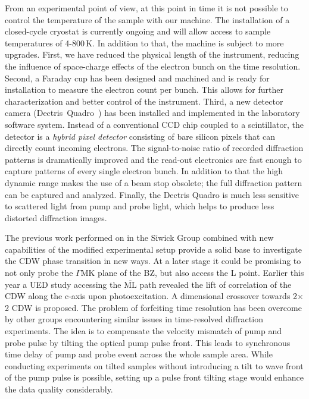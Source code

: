 From an experimental point of view, at this point in time it is not possible to control the temperature of the sample with our machine.
The installation of a closed-cycle cryostat is currently ongoing and will allow access to sample temperatures of 4-800\,K.
In addition to that, the machine is subject to more upgrades.
First, we have reduced the physical length of the instrument, reducing the influence of space-charge effects of the electron bunch on the time resolution.
Second, a Faraday cup has been designed and machined and is ready for installation to measure the electron count per bunch.
This allows for further characterization and better control of the instrument.
Third, a new detector camera (Dectris~Quadro~\cite{dectris2022}) has been installed and implemented in the laboratory software system.
Instead of a conventional CCD chip coupled to a scintillator, the detector is a \emph{hybrid pixel detector} consisting of bare silicon pixels that can directly count incoming electrons.
The signal-to-noise ratio of recorded diffraction patterns is dramatically improved and the read-out electronics are fast enough to capture patterns of every single electron bunch.
In addition to that the high dynamic range makes the use of a beam stop obsolete; the full diffraction pattern can be captured and analyzed.
Finally, the Dectris Quadro is much less sensitive to scattered light from pump and probe light, which helps to produce less distorted diffraction images.

The previous work performed on \ts\space in the Siwick Group combined with new capabilities of the modified experimental setup provide a solid base to investigate the \ac{CDW} phase transition in new ways.
At a later stage it could be promising to not only probe the $\Gamma\mathrm{MK}$ plane of the \ac{BZ}, but also access the L point.
Earlier this year a \ac{UED} study accessing the $\overline{\mathrm{ML}}$ path revealed the lift of correlation of the \ac{CDW} along the c-axis upon photoexcitation.
A dimensional crossover towards 2$\times$2 \ac{CDW} is proposed\cite{cheng2022}.
The problem of forfeiting time resolution has been overcome by other groups encountering similar issues in time-resolved diffraction experiments.
The idea is to compensate the velocity mismatch of pump and probe pulse by tilting the optical pump pulse front.
This leads to synchronous time delay of pump and probe event across the whole sample area\cite{baum2006,zhou2013}.
While conducting experiments on tilted samples without introducing a tilt to wave front of the pump pulse is possible, setting up a pulse front tilting stage would enhance the data quality considerably.

